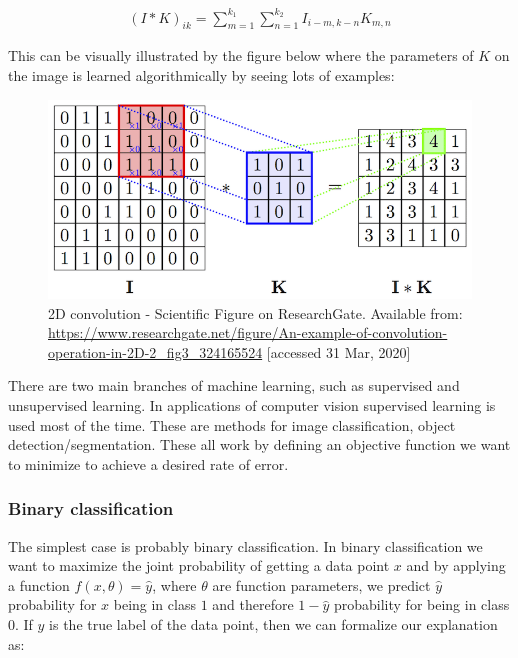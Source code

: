 \documentclass[a4paper,12pt]{article}
\begin{document}
\vspace{4mm}

\begin{align*}
    (I * K)_{ik} = \sum_{m = 1}^{k_1}\sum_{n = 1}^{k_2} I_{i - m, k - n} K_{m, n}
\end{align*}

\vspace{4mm}

\par This can be visually illustrated by the figure below where the parameters of $K$ on the image is learned algorithmically by seeing lots of examples:

\vspace{4mm}

\begin{figure}[H]
    \centering
    \includegraphics[width=0.7\linewidth]{An-example-of-convolution-operation-in-2D-2.png}
    \caption{2D convolution - Scientific Figure on ResearchGate. Available from: \url{https://www.researchgate.net/figure/An-example-of-convolution-operation-in-2D-2_fig3_324165524} [accessed 31 Mar, 2020]}
    \label{fig:2d-conv}
\end{figure}

\vspace{4mm}

\par There are two main branches of machine learning, such as supervised and unsupervised learning. In applications of computer vision supervised learning is used most of the time. These are methods for image classification, object detection/segmentation. These all work by defining an objective function we want to minimize to achieve a desired rate of error. 

\subsubsection{Binary classification}

\par The simplest case is probably binary classification. In binary classification we want to maximize the joint probability of getting a data point $x$ and by applying a function $f(x, \theta) = \hat{y}$, where $\theta$ are function parameters, we predict $\hat{y}$ probability for $x$ being in class $1$ and therefore $1 - \hat{y}$ probability for being in class $0$. If $y$ is the true label of the data point, then we can formalize our explanation as:
\end{document}
